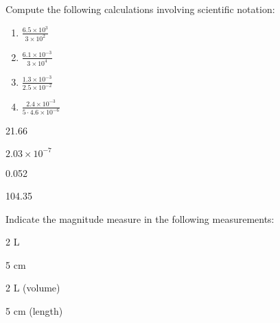 \documentclass[main.tex]{subfiles}
\begin{document}
\begin{multicols*}{2}
\begin{question}[ID=\the\value{numA}]
Compute the following calculations involving scientific notation:
\begin{multicols}{3}  
\noindent
  \begin{enumerate} [ label=(\alph*)]	
\item $\frac{6.5\times 10^{3}}{3\times 10^{2}}$
\item $\frac{6.1\times 10^{-3}}{3\times 10^{4}}$
\item $\frac{1.3\times 10^{-3}}{2.5\times 10^{-2}}$
\item $\frac{2.4\times 10^{-3}}{5\cdot 4.6\times 10^{-6}}$
\end{enumerate}
\end{multicols}
\end{question}
\begin{solution}
\begin{inparaenum}[(a)]
  \item 21.66
    \item $2.03\times 10^{-7}$
\item 0.052
\item 104.35
 \end{inparaenum}
\hspace{0.1cm}\end{solution}%


\begin{question}[ID=\the\value{numA}]
Indicate the magnitude measure in the following measurements: 
\begin{inparaenum}[(a)]
\item 2 L %
\item 5 cm %
\end{inparaenum}
\end{question}
\begin{solution}
\begin{inparaenum}[(a)]
\item 2 L  (volume)
\item 5 cm  (length) 
\end{inparaenum}
\hspace{0.1cm}\end{solution}





\end{multicols*}
\end{document}
